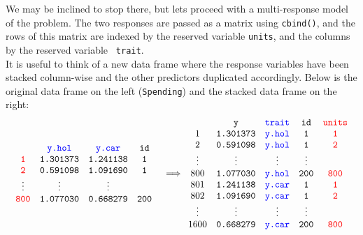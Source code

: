 \documentclass{article}
\begin{document}
 We may be inclined to stop there, but lets proceed with a multi-response model of the problem. The two responses are passed as a matrix using \texttt{cbind()}, and the rows of this matrix are indexed by the reserved variable {\color{red} \texttt{units}}, and the columns by the reserved variable \texttt{\color{blue} \texttt{trait}}.\\ 

It is useful to think of a new data frame where the response variables have been stacked column-wise and the other predictors duplicated accordingly. Below is the original data frame on the left (\texttt{Spending}) and the stacked data frame on the right:\\  

\begin{displaymath}
\begin{array}{cc}
\begin{array}{cccc}
&{\color{blue} \texttt{y.hol}}&{\color{blue} \texttt{y.car}}&\texttt{id}\\
{\color{red} \texttt{1}}&\texttt{1.301373}&\texttt{1.241138}&\texttt{1}\\
{\color{red} \texttt{2}}&\texttt{0.591098}&\texttt{1.091690}&\texttt{1}\\
\vdots&\vdots&\vdots\\
{\color{red} \texttt{800}}&\texttt{1.077030}&\texttt{0.668279}&\texttt{200}\\
\end{array}&
\Longrightarrow
\begin{array}{ccccc}
&\texttt{y}&{\color{blue} \texttt{trait}}&\texttt{id}&{\color{red} \texttt{units}}\\
1&\texttt{1.301373}&{\color{blue} \texttt{y.hol}}&\texttt{1}&{\color{red} \texttt{1}}\\
2&\texttt{0.591098}&{\color{blue} \texttt{y.hol}}&\texttt{1}&{\color{red} \texttt{2}}\\
\vdots&\vdots&\vdots&\vdots\\
800&\texttt{1.077030}&{\color{blue} \texttt{y.hol}}&\texttt{200}&{\color{red} \texttt{800}}\\
801&\texttt{1.241138}&{\color{blue} \texttt{y.car}}&\texttt{1}&{\color{red} \texttt{1}}\\
802&\texttt{1.091690}&{\color{blue} \texttt{y.car}}&\texttt{1}&{\color{red} \texttt{2}}\\
\vdots&\vdots&\vdots&\vdots\\
1600&\texttt{0.668279}&{\color{blue} \texttt{y.car}}&\texttt{200}&{\color{red} \texttt{800}}\\
\end{array}
\end{array}
\end{displaymath}
\end{document}
